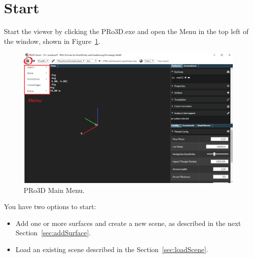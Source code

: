 \section{Start}
\label{sec:startViewer}

Start the viewer by clicking the PRo3D.exe and open the Menu in the top left of the window, shown in Figure~\ref{fig:StartMenu}.
\begin{figure}[h]
    	\centering
    		\includegraphics[width=1\textwidth]{pics/startAI.png}
    	\caption[Start Menu]{PRo3D Main Menu. }
    	\label{fig:StartMenu}
   \end{figure}

You have two options to start:
\begin{itemize}
	\item Add one or more surfaces and create a new scene, as described in the next Section~\ref{sec:addSurface}.
	\item Load an existing scene described in the Section~\ref{sec:loadScene}. 
\end{itemize}



